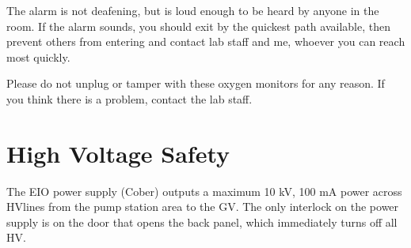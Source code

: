 The alarm is not deafening, but is loud enough to be heard by anyone in the room.  If the alarm sounds, you should exit by the quickest path available, then prevent others from entering and contact lab staff and me, whoever you can reach most quickly.

Please do not unplug or tamper with these oxygen monitors for any reason.  If you think there is a problem, contact the lab staff.

\section{High Voltage Safety}

The EIO power supply (Cober) outputs a maximum 10 kV, 100 mA power across HVlines from the pump station area to the GV.  The only interlock on the power supply is on the door that opens the back panel, which immediately turns off all HV.

